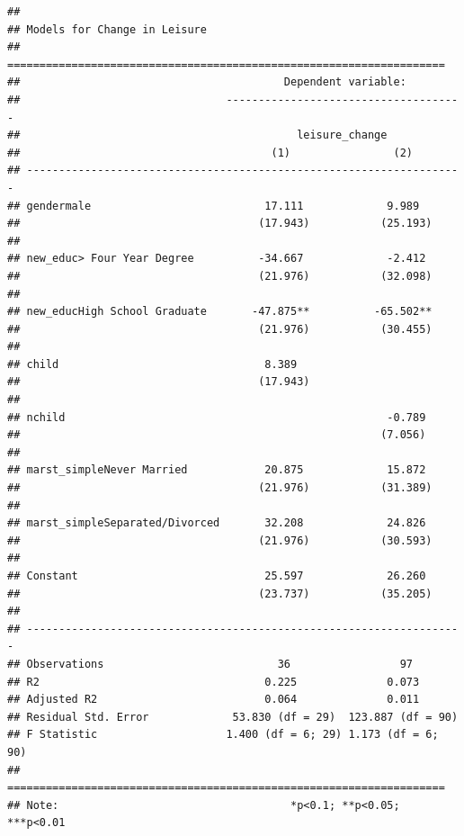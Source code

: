 \documentclass[
]{article}
\begin{document}
\begin{verbatim}
## 
## Models for Change in Leisure
## ====================================================================
##                                         Dependent variable:         
##                                -------------------------------------
##                                           leisure_change            
##                                       (1)                (2)        
## --------------------------------------------------------------------
## gendermale                           17.111             9.989       
##                                     (17.943)           (25.193)     
##                                                                     
## new_educ> Four Year Degree          -34.667             -2.412      
##                                     (21.976)           (32.098)     
##                                                                     
## new_educHigh School Graduate       -47.875**          -65.502**     
##                                     (21.976)           (30.455)     
##                                                                     
## child                                8.389                          
##                                     (17.943)                        
##                                                                     
## nchild                                                  -0.789      
##                                                        (7.056)      
##                                                                     
## marst_simpleNever Married            20.875             15.872      
##                                     (21.976)           (31.389)     
##                                                                     
## marst_simpleSeparated/Divorced       32.208             24.826      
##                                     (21.976)           (30.593)     
##                                                                     
## Constant                             25.597             26.260      
##                                     (23.737)           (35.205)     
##                                                                     
## --------------------------------------------------------------------
## Observations                           36                 97        
## R2                                   0.225              0.073       
## Adjusted R2                          0.064              0.011       
## Residual Std. Error             53.830 (df = 29)  123.887 (df = 90) 
## F Statistic                    1.400 (df = 6; 29) 1.173 (df = 6; 90)
## ====================================================================
## Note:                                    *p<0.1; **p<0.05; ***p<0.01
\end{verbatim}
\end{document}
